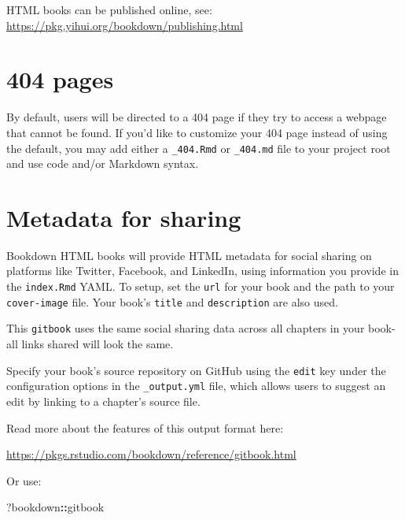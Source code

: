 \documentclass[
]{book}
\newenvironment{Shaded}{\begin{snugshade}}{\end{snugshade}}
\newcommand{\NormalTok}[1]{#1}
\newcommand{\SpecialCharTok}[1]{\textcolor[rgb]{0.81,0.36,0.00}{\textbf{#1}}}
\theoremstyle{definition}
\theoremstyle{definition}
\theoremstyle{definition}
\theoremstyle{definition}
\theoremstyle{remark}
\begin{document}
HTML books can be published online, see: \url{https://pkg.yihui.org/bookdown/publishing.html}

\section{404 pages}\label{pages}

By default, users will be directed to a 404 page if they try to access a webpage that cannot be found. If you'd like to customize your 404 page instead of using the default, you may add either a \texttt{\_404.Rmd} or \texttt{\_404.md} file to your project root and use code and/or Markdown syntax.

\section{Metadata for sharing}\label{metadata-for-sharing}

Bookdown HTML books will provide HTML metadata for social sharing on platforms like Twitter, Facebook, and LinkedIn, using information you provide in the \texttt{index.Rmd} YAML. To setup, set the \texttt{url} for your book and the path to your \texttt{cover-image} file. Your book's \texttt{title} and \texttt{description} are also used.

This \texttt{gitbook} uses the same social sharing data across all chapters in your book- all links shared will look the same.

Specify your book's source repository on GitHub using the \texttt{edit} key under the configuration options in the \texttt{\_output.yml} file, which allows users to suggest an edit by linking to a chapter's source file.

Read more about the features of this output format here:

\url{https://pkgs.rstudio.com/bookdown/reference/gitbook.html}

Or use:

\begin{Shaded}
\begin{Highlighting}[]
\NormalTok{?bookdown}\SpecialCharTok{::}\NormalTok{gitbook}
\end{Highlighting}
\end{Shaded}



\end{document}
